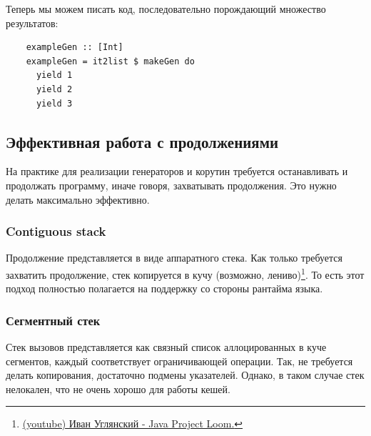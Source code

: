 Теперь мы можем писать код, последовательно порождающий множество результатов:
\begin{verbatim}
    exampleGen :: [Int]
    exampleGen = it2list $ makeGen do
      yield 1
      yield 2
      yield 3
\end{verbatim}









\subsection{Эффективная работа с продолжениями} \label{subsec:efficient-cps}

На практике для реализации генераторов и корутин требуется останавливать и продолжать программу, иначе говоря, захватывать продолжения.
Это нужно делать максимально эффективно.


\subsubsection{Contiguous stack}

Продолжение представляется в виде аппаратного стека.
Как только требуется захватить продолжение, стек копируется в кучу (возможно, лениво)\footnote{\href{https://youtu.be/kwS3OeoVCno?si=c4MkSkmLHNeywPrZ}{(youtube) Иван Углянский - Java Project Loom.}}. %
То есть этот подход полностью полагается на поддержку со стороны рантайма языка.

\subsubsection{Сегментный стек} %

Стек вызовов представляется как связный список аллоцированных в куче сегментов, каждый соответствует ограничивающей операции.
Так, не требуется делать копирования, достаточно подмены указателей.
Однако, в таком случае стек нелокален, что не очень хорошо для работы кешей.


